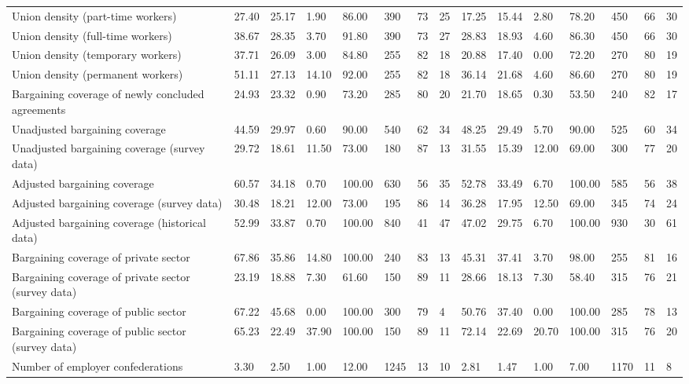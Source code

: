 \begin{longtable}{lllllllllllllll}
Union density (part-time workers) & 27.40 & 25.17 & 1.90 & 86.00 & 390 & 73 & 25 & 17.25 & 15.44 & 2.80 & 78.20 & 450 & 66 & 30\\
Union density (full-time workers) & 38.67 & 28.35 & 3.70 & 91.80 & 390 & 73 & 27 & 28.83 & 18.93 & 4.60 & 86.30 & 450 & 66 & 30\\
Union density (temporary workers) & 37.71 & 26.09 & 3.00 & 84.80 & 255 & 82 & 18 & 20.88 & 17.40 & 0.00 & 72.20 & 270 & 80 & 19\\
Union density (permanent workers) & 51.11 & 27.13 & 14.10 & 92.00 & 255 & 82 & 18 & 36.14 & 21.68 & 4.60 & 86.60 & 270 & 80 & 19\\
\addlinespace
Bargaining coverage of newly concluded agreements & 24.93 & 23.32 & 0.90 & 73.20 & 285 & 80 & 20 & 21.70 & 18.65 & 0.30 & 53.50 & 240 & 82 & 17\\
Unadjusted bargaining coverage & 44.59 & 29.97 & 0.60 & 90.00 & 540 & 62 & 34 & 48.25 & 29.49 & 5.70 & 90.00 & 525 & 60 & 34\\
Unadjusted bargaining coverage (survey data) & 29.72 & 18.61 & 11.50 & 73.00 & 180 & 87 & 13 & 31.55 & 15.39 & 12.00 & 69.00 & 300 & 77 & 20\\
Adjusted bargaining coverage & 60.57 & 34.18 & 0.70 & 100.00 & 630 & 56 & 35 & 52.78 & 33.49 & 6.70 & 100.00 & 585 & 56 & 38\\
Adjusted bargaining coverage (survey data) & 30.48 & 18.21 & 12.00 & 73.00 & 195 & 86 & 14 & 36.28 & 17.95 & 12.50 & 69.00 & 345 & 74 & 24\\
\addlinespace
Adjusted bargaining coverage (historical data) & 52.99 & 33.87 & 0.70 & 100.00 & 840 & 41 & 47 & 47.02 & 29.75 & 6.70 & 100.00 & 930 & 30 & 61\\
Bargaining coverage of private sector & 67.86 & 35.86 & 14.80 & 100.00 & 240 & 83 & 13 & 45.31 & 37.41 & 3.70 & 98.00 & 255 & 81 & 16\\
Bargaining coverage of private sector (survey data) & 23.19 & 18.88 & 7.30 & 61.60 & 150 & 89 & 11 & 28.66 & 18.13 & 7.30 & 58.40 & 315 & 76 & 21\\
Bargaining coverage of public sector & 67.22 & 45.68 & 0.00 & 100.00 & 300 & 79 & 4 & 50.76 & 37.40 & 0.00 & 100.00 & 285 & 78 & 13\\
Bargaining coverage of public sector (survey data) & 65.23 & 22.49 & 37.90 & 100.00 & 150 & 89 & 11 & 72.14 & 22.69 & 20.70 & 100.00 & 315 & 76 & 20\\
\addlinespace
Number of employer confederations & 3.30 & 2.50 & 1.00 & 12.00 & 1245 & 13 & 10 & 2.81 & 1.47 & 1.00 & 7.00 & 1170 & 11 & 8\\

\end{longtable}
